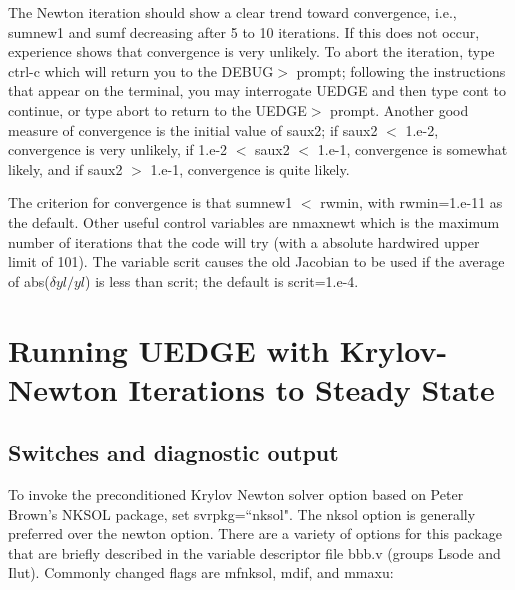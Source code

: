 \documentclass [12pt]{article}
\begin{document}
The Newton iteration should show a clear trend toward convergence, i.e.,
sumnew1 and sumf decreasing after 5 to 10 iterations.  If this does not occur,
experience shows that convergence is very unlikely.  To abort the iteration,
type ctrl-c which will return you to the DEBUG$>$ prompt; following the
instructions that appear on the terminal, you may interrogate {\sf UEDGE} and
then type {\sf cont} to continue, or type {\sf abort} to return to the {\sf
  UEDGE$>$} prompt. Another good measure of convergence is the initial value
of saux2; if saux2 $<$ 1.e-2, convergence is very unlikely, if 1.e-2 $<$ saux2
$<$ 1.e-1, convergence is somewhat likely, and if saux2 $>$ 1.e-1, convergence
is quite likely.

The criterion for convergence is that sumnew1 $<$ rwmin, with rwmin=1.e-11
as the default.  Other useful control variables are nmaxnewt which is the
maximum number of iterations that the code will try (with a absolute
hardwired upper limit of 101).  The variable scrit causes the old Jacobian
to be used if the average of abs($\delta yl/yl$) is less than {\sf scrit}; the
default is {\sf scrit=1.e-4}.



\section{Running {\sf UEDGE} with Krylov-Newton Iterations to Steady State}

\subsection{Switches and diagnostic output}

To invoke the preconditioned Krylov Newton solver option based on Peter
Brown's {\sf NKSOL} package, set svrpkg=``nksol".  The {\sf nksol} option is
generally preferred over the {\sf newton} option.  There are a variety of
options for this package that are briefly described in the variable descriptor
file bbb.v (groups Lsode and Ilut).  Commonly changed flags are mfnksol, mdif,
and mmaxu:
\end{document}
